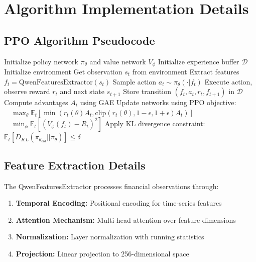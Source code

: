 \documentclass[10pt]{IEEEtran}
\begin{document}
\section{Algorithm Implementation Details}

\subsection{PPO Algorithm Pseudocode}
\begin{algorithm}[h]
\caption{PPO with Custom Features}
\begin{algorithmic}[1]
\STATE Initialize policy network $\pi_\theta$ and value network $V_\phi$
\STATE Initialize experience buffer $\mathcal{D}$
    \STATE Initialize environment
        \STATE Get observation $s_t$ from environment
        \STATE Extract features $f_t = \text{QwenFeaturesExtractor}(s_t)$
        \STATE Sample action $a_t \sim \pi_\theta(\cdot|f_t)$
        \STATE Execute action, observe reward $r_t$ and next state $s_{t+1}$
        \STATE Store transition $(f_t, a_t, r_t, f_{t+1})$ in $\mathcal{D}$
    \ENDFOR
    \STATE Compute advantages $A_t$ using GAE
    \STATE Update networks using PPO objective:
    \STATE $\quad \max_\theta \mathbb{E}_t[\min(r_t(\theta)A_t, \text{clip}(r_t(\theta), 1-\epsilon, 1+\epsilon)A_t)]$
    \STATE $\quad \min_\phi \mathbb{E}_t[(V_\phi(f_t) - R_t)^2]$
    \STATE Apply KL divergence constraint: $\mathbb{E}_t[D_{KL}(\pi_{\theta_{old}}||\pi_\theta)] \leq \delta$
\ENDFOR
\end{algorithmic}
\end{algorithm}

\subsection{Feature Extraction Details}
The QwenFeaturesExtractor processes financial observations through:

\begin{enumerate}
\item \textbf{Temporal Encoding:} Positional encoding for time-series features
\item \textbf{Attention Mechanism:} Multi-head attention over feature dimensions
\item \textbf{Normalization:} Layer normalization with running statistics
\item \textbf{Projection:} Linear projection to 256-dimensional space
\end{enumerate}
\end{document}
